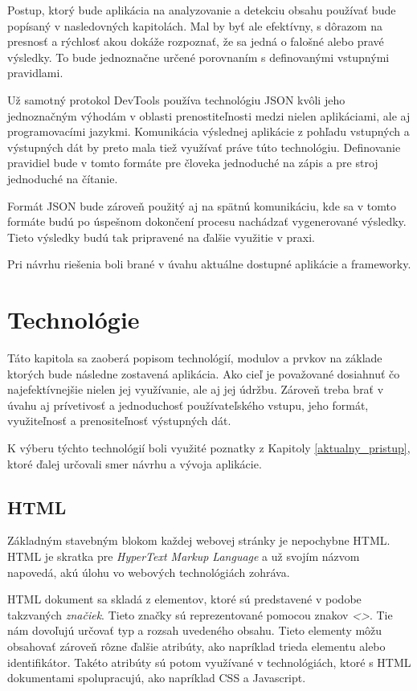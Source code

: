 Postup, ktorý bude aplikácia na analyzovanie a detekciu obsahu používať bude popísaný v nasledovných kapitolách. Mal by byť ale efektívny, s dôrazom na presnosť a rýchlosť akou dokáže rozpoznať, že sa jedná o falošné alebo pravé výsledky. To bude jednoznačne určené porovnaním s definovanými vstupnými pravidlami.

\bigskip

Už samotný protokol DevTools používa technológiu JSON kvôli jeho jednoznačným výhodám v oblasti prenostiteľnosti medzi nielen aplikáciami, ale aj programovacími jazykmi. Komunikácia výslednej aplikácie z pohľadu vstupných a výstupných dát by preto mala tiež využívať práve túto technológiu. Definovanie pravidiel bude v tomto formáte pre človeka jednoduché na zápis a pre stroj jednoduché na čítanie. 

Formát JSON bude zároveň použitý aj na spätnú komunikáciu, kde sa v tomto formáte budú po úspešnom dokončení procesu nachádzať vygenerované výsledky. Tieto výsledky budú tak pripravené na ďalšie využitie v praxi.

Pri návrhu riešenia boli brané v úvahu aktuálne dostupné aplikácie a frameworky. 


\chapter{Technológie}
\label{Technologie}

Táto kapitola sa zaoberá popisom technológií, modulov a prvkov na základe ktorých bude následne zostavená aplikácia. Ako cieľ je považované dosiahnuť čo najefektívnejšie nielen jej využívanie, ale aj jej údržbu. Zároveň treba brať v úvahu aj prívetivosť a jednoduchosť používateľského vstupu, jeho formát, využiteľnosť a prenositeľnosť výstupných dát. 

K výberu týchto technológií boli využité poznatky z Kapitoly \ref{aktualny_pristup}, ktoré ďalej určovali smer návrhu a vývoja aplikácie.

\section{HTML}

Základným stavebným blokom každej webovej stránky je nepochybne HTML. HTML je skratka pre \textit{HyperText Markup Language} a už svojím názvom napovedá, akú úlohu vo webových technológiách zohráva. 

HTML dokument sa skladá z elementov, ktoré sú predstavené v podobe takzvaných \textit{značiek}. Tieto značky sú reprezentované pomocou znakov \textit{<>}. Tie nám dovoľujú určovať typ a rozsah uvedeného obsahu. Tieto elementy môžu obsahovať zároveň rôzne ďalšie atribúty, ako napríklad trieda elementu alebo identifikátor. Takéto atribúty sú potom využívané v technológiách, ktoré s HTML dokumentami spolupracujú, ako napríklad CSS a Javascript.

